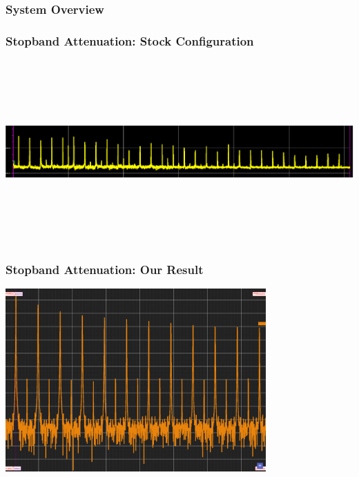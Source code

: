 
\begin{frame}
    \frametitle{System Overview}
    \begin{center}
        
    \end{center}
\end{frame}

\begin{frame}
    \frametitle{Stopband Attenuation: Stock Configuration}
    \centering
    \includegraphics[width=\textwidth,height=70mm]{images/pitastock.png}
\end{frame}

\begin{frame}
    \frametitle{Stopband Attenuation: Our Result}
    \centering
    \includegraphics[width=\textwidth,height=70mm]{images/pitanew.png}
\end{frame}

%

%    
